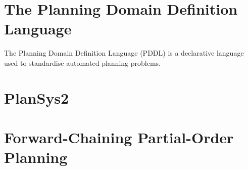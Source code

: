 
\section{The Planning Domain Definition Language}
The Planning Domain Definition Language (PDDL) is a declarative language used to standardise automated planning problems. 

\cite{ghallab_pddl_1998}
\cite{alaboud_getting_2024}

\section{PlanSys2}

\section{Forward-Chaining Partial-Order Planning}

\cite{martin_plansys2_2021}